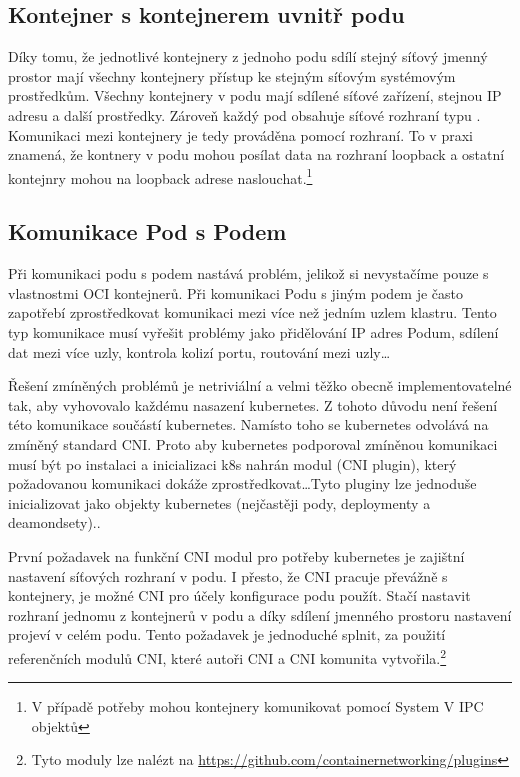 \subsection{Kontejner s kontejnerem uvnitř podu}
Díky tomu, že jednotlivé kontejnery z jednoho podu sdílí stejný síťový jmenný prostor mají všechny kontejnery přístup ke stejným síťovým systémovým prostředkům. Všechny kontejnery v podu mají sdílené síťové zařízení, stejnou IP adresu a další prostředky. Zároveň každý pod obsahuje síťové rozhraní typu . Komunikaci mezi kontejnery je tedy prováděna pomocí  rozhraní. To v praxi znamená, že kontnery v podu mohou posílat data na rozhraní loopback a ostatní kontejnry mohou na loopback adrese naslouchat.\footnote{V případě potřeby mohou kontejnery komunikovat pomocí System V IPC objektů}

\subsection{Komunikace Pod s Podem}
Při komunikaci podu s podem nastává problém, jelikož si nevystačíme pouze s vlastnostmi OCI kontejnerů. Při komunikaci Podu s jiným podem je často zapotřebí zprostředkovat komunikaci mezi více než jedním uzlem klastru.
Tento typ komunikace musí vyřešit problémy jako přidělování IP adres Podum, sdílení dat mezi více uzly, kontrola kolizí portu, routování mezi uzly\ldots

Řešení zmíněných problémů je netriviální a velmi těžko obecně implementovatelné tak, aby vyhovovalo každému nasazení kubernetes. Z tohoto důvodu není řešení této komunikace součástí kubernetes. Namísto toho se kubernetes odvolává na zmíněný standard CNI. Proto aby kubernetes podporoval zmíněnou komunikaci musí být po instalaci a inicializaci k8s nahrán modul (CNI plugin), který požadovanou komunikaci dokáže zprostředkovat\ldots{Tyto pluginy lze jednoduše inicializovat jako objekty kubernetes (nejčastěji pody, deploymenty a deamondsety).}.

První požadavek na funkční CNI modul pro potřeby kubernetes je zajištní nastavení síťových rozhraní v podu. I přesto, že CNI pracuje převážně s kontejnery, je možné CNI pro účely konfigurace podu použít. Stačí nastavit rozhraní jednomu z kontejnerů v podu a díky sdílení jmenného prostoru nastavení projeví v celém podu. Tento požadavek je jednoduché splnit, za použití referenčních modulů CNI, které autoři CNI a CNI komunita vytvořila.\footnote{Tyto moduly lze nalézt na \href{https://github.com/containernetworking/plugins}{https://github.com/containernetworking/plugins}}

